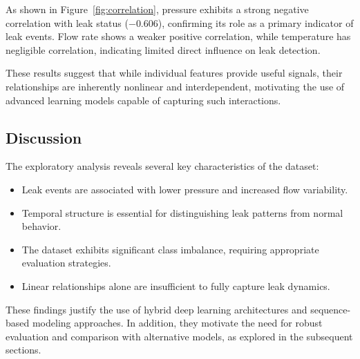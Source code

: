 As shown in Figure~\ref{fig:correlation}, pressure exhibits a strong negative
correlation with leak status ($-0.606$), confirming its role as a primary
indicator of leak events. Flow rate shows a weaker positive correlation,
while temperature has negligible correlation, indicating limited direct
influence on leak detection.

These results suggest that while individual features provide useful signals,
their relationships are inherently nonlinear and interdependent, motivating
the use of advanced learning models capable of capturing such interactions.

\subsection{Discussion}

The exploratory analysis reveals several key characteristics of the dataset:

\begin{itemize}
    \item Leak events are associated with lower pressure and increased flow variability.
    \item Temporal structure is essential for distinguishing leak patterns from normal behavior.
    \item The dataset exhibits significant class imbalance, requiring appropriate evaluation strategies.
    \item Linear relationships alone are insufficient to fully capture leak dynamics.
\end{itemize}

These findings justify the use of hybrid deep learning architectures and
sequence-based modeling approaches. In addition, they motivate the need for
robust evaluation and comparison with alternative models, as explored in the
subsequent sections.